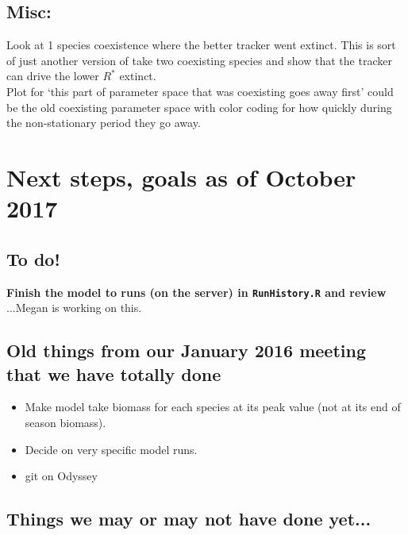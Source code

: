 \documentclass[11pt,a4paper,oneside]{article}
\begin{document}
\subsection{Misc:} 
Look at 1 species coexistence where the better tracker went extinct. This is sort of just another version of take two coexisting species and show that the tracker can drive the lower $R^*$ extinct.\\

Plot for `this part of parameter space that was coexisting goes away first' could be the old coexisting parameter space with color coding for how quickly during the non-stationary period they go away. 



\newpage
\section{Next steps, goals as of October 2017}
\subsection{To do!}
{\bf Finish the model to runs (on the server) in \verb|RunHistory.R| and review} ...Megan is working on this.

\subsection{Old things from our January 2016 meeting that we have totally done}
\begin{itemize}
\item Make model take biomass for each species at its peak value (not at its end of season biomass).
\item Decide on very specific model runs.
\item git on Odyssey
\end{itemize}

\subsection{Things we may or may not have done yet...}
\end{document}
